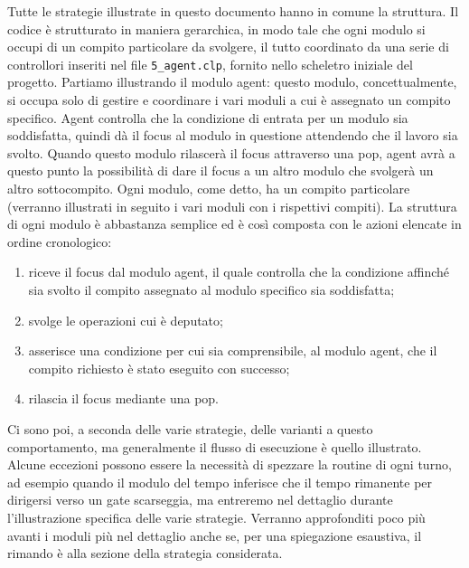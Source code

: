 Tutte le strategie illustrate in questo documento hanno in comune la struttura.
Il codice è strutturato in maniera gerarchica, in modo tale che ogni modulo si occupi di un compito particolare da svolgere, il tutto coordinato da una serie di controllori inseriti nel file \texttt{5\_agent.clp}, fornito nello scheletro iniziale del progetto.
Partiamo illustrando il modulo agent: questo modulo, concettualmente, si occupa solo di gestire e coordinare i vari moduli a cui è assegnato un compito specifico. Agent controlla che la condizione di entrata per un modulo sia soddisfatta, quindi dà il focus al modulo in questione attendendo che il lavoro sia svolto. Quando questo modulo rilascerà il focus attraverso una pop, agent avrà a questo punto la possibilità di dare il focus a un altro modulo che svolgerà un altro sottocompito.
Ogni modulo, come detto, ha un compito particolare (verranno illustrati in seguito i vari moduli con i rispettivi compiti). La struttura di ogni modulo è abbastanza semplice ed è così composta con le azioni elencate in ordine cronologico: 
\begin{enumerate}
	\item riceve il focus dal modulo agent, il quale controlla che la condizione affinché sia svolto il compito assegnato al modulo specifico sia soddisfatta;
	\item svolge le operazioni cui è deputato;
	\item asserisce una condizione per cui sia comprensibile, al modulo agent, che il compito richiesto è stato eseguito con successo;
	\item rilascia il focus mediante una pop.
\end{enumerate}
Ci sono poi, a seconda delle varie strategie, delle varianti a questo comportamento, ma generalmente il flusso di esecuzione è quello illustrato. Alcune eccezioni possono essere la necessità di spezzare la routine di ogni turno, ad esempio quando il modulo del tempo inferisce che il tempo rimanente per dirigersi verso un gate scarseggia, ma entreremo nel dettaglio durante l'illustrazione specifica delle varie strategie.
Verranno approfonditi poco più avanti i moduli più nel dettaglio anche se, per una spiegazione esaustiva, il rimando è alla sezione della strategia considerata.

